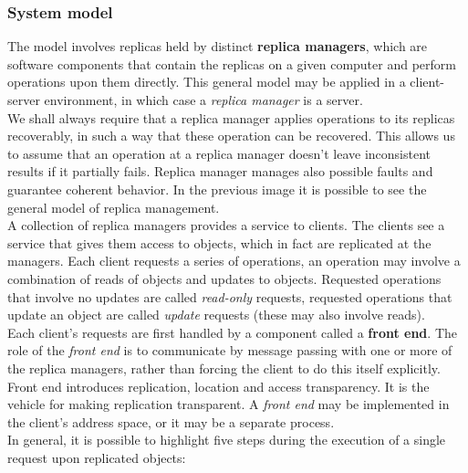 \subsubsection{System model}
The model involves replicas held by distinct \textbf{replica managers}, which are software components that contain the replicas on a given computer and perform operations upon them directly. This general model may be applied in a client-server environment, in which case a \textit{replica manager} is a server.\\
We shall always require that a replica manager applies operations to its replicas recoverably, in such a way that these operation can be recovered. This allows us to assume that an operation at a replica manager doesn't leave inconsistent results if it partially fails. Replica manager manages also possible faults and guarantee coherent behavior.
In the previous image it is possible to see the general model of replica management.\\
A collection of replica managers provides a service to clients. The clients see a service that gives them access to objects, which in fact are replicated at the managers. Each client requests a series of operations, an operation may involve a combination of reads of objects and updates to objects. Requested operations that involve no updates are called \textit{read-only} requests, requested operations that update an object are called \textit{update} requests (these may also involve reads).\\
Each client’s requests are first handled by a component called a \textbf{front end}. The role of the \textit{front end} is to communicate by message passing with one or more of the replica managers, rather than forcing the client to do this itself explicitly. Front end introduces replication, location and access transparency. It is the vehicle for making replication transparent. A \textit{front end} may be implemented in the client’s address space, or it may be a separate process.\\
In general, it is possible to highlight five steps during the execution of a single request upon replicated objects:
